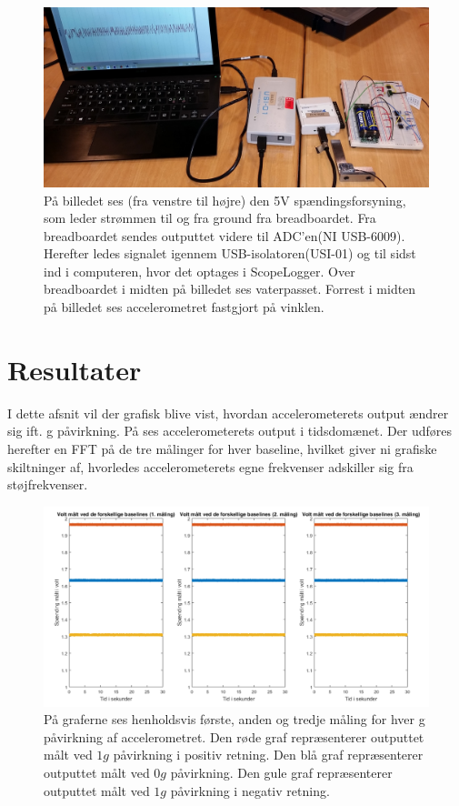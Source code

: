 \begin{figure}[H]
	\centering
	\includegraphics[scale=0.14]{figures/cProblemloesning/Pilotforsoeg1_2.jpg}
	\caption{På billedet ses (fra venstre til højre) den 5V spændingsforsyning, som leder strømmen til og fra ground fra breadboardet. Fra breadboardet sendes outputtet videre til ADC'en(NI USB-6009). Herefter ledes signalet igennem USB-isolatoren(USI-01) og til sidst ind i computeren, hvor det optages i ScopeLogger. Over breadboardet i midten på billedet ses vaterpasset. Forrest i midten på billedet ses accelerometret fastgjort på vinklen.}
	\label{pforsoeg2}
\end{figure}

\section{Resultater}\label{Sec_Pilot_Data}
I dette afsnit vil der grafisk blive vist, hvordan accelerometerets output ændrer sig ift. g påvirkning. På  ses accelerometerets output i tidsdomænet. Der udføres herefter en FFT på de tre målinger for hver baseline, hvilket giver ni grafiske skiltninger af, hvorledes accelerometerets egne frekvenser adskiller sig fra støjfrekvenser.

\begin{figure}[H]
	\centering
	\includegraphics[scale=0.45]{figures/cProblemloesning/Pilotforsoeg_Tid.png}
	\caption{På graferne ses henholdsvis første, anden og tredje måling for hver g påvirkning af accelerometret. Den røde graf repræsenterer outputtet målt ved $1g$ påvirkning i positiv retning. Den blå graf repræsenterer outputtet målt ved $0g$ påvirkning. Den gule graf repræsenterer outputtet målt ved $1g$ påvirkning i negativ retning.}
	\label{Fig:Pilot_Tid}
\end{figure}

